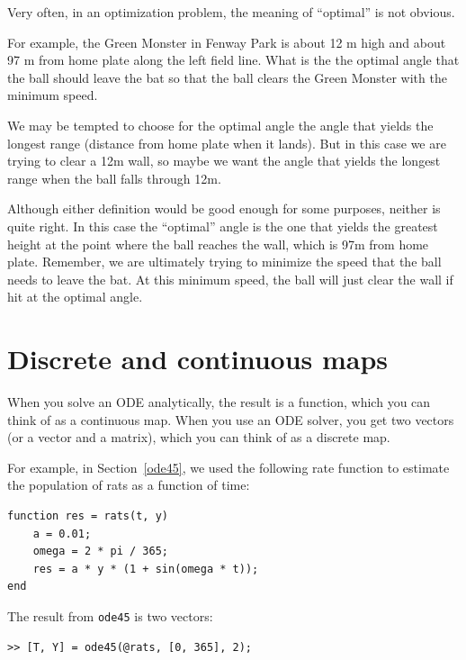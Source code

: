 \documentclass{book}
\begin{document}
\begin{ex}
Very often, in an optimization problem, the meaning of ``optimal'' is not obvious.

For example, the Green Monster in Fenway Park is about 12 m high and about 97
m from home plate along the left field line.  
What is the
the optimal angle that the ball should leave 
the bat so that the ball clears the Green Monster with the minimum speed.

We may be tempted
to choose for the optimal angle the angle that yields the longest
range (distance from home plate when it lands).  But in this
case we are trying to clear a 12m wall, so maybe we want
the angle that yields the longest range when the ball falls
through 12m.

Although either definition would be good enough for some purposes,
neither is quite right.  In this case the ``optimal'' angle is
the one that yields the greatest height at the point where
the ball reaches the wall, which is 97m from home plate.
Remember, we are ultimately trying to minimize 
the speed that the ball needs to leave the bat.  At this minimum speed,
the ball will just clear the wall if hit at the optimal angle. 
\end{ex}

\section{Discrete and continuous maps}

When you solve an ODE analytically, the result is a function,
which you can think of as a continuous map.  When you use an
ODE solver, you get two vectors (or a vector and a matrix), which
you can think of as a discrete map.

For example, in Section~\ref{ode45}, we used the following rate
function to estimate the population of rats as a function of time:

\begin{verbatim}
function res = rats(t, y)
    a = 0.01;
    omega = 2 * pi / 365;
    res = a * y * (1 + sin(omega * t));
end
\end{verbatim}

The result from {\tt ode45} is two vectors:

\begin{verbatim}
>> [T, Y] = ode45(@rats, [0, 365], 2);
\end{verbatim}
\end{document}
